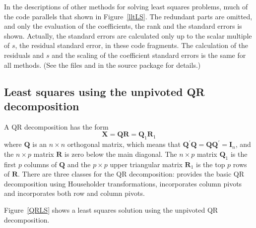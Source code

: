 \documentclass[shortnames,article]{jss}
\begin{document}
In the descriptions of other methods for solving least squares
problems, much of the code parallels that shown in
Figure~\ref{lltLS}.  The redundant parts are omitted, and only
the evaluation of the coefficients, the rank and the standard errors is shown.
Actually, the standard errors are calculated only up to the scalar
multiple of $s$, the residual standard error, in these code fragments.
The calculation of the residuals and $s$ and the scaling of the
coefficient standard errors is the same for all methods.  (See the
files  and  in the 
source package for details.)


\subsection{Least squares using the unpivoted QR decomposition}
\label{sec:QR}

A QR decomposition has the form
\begin{displaymath}
  \bm X=\bm Q\bm R=\bm Q_1\bm R_1
\end{displaymath}
where $\bm Q$ is an $n\times n$ orthogonal matrix, which means that
$\bm Q^\prime\bm Q=\bm Q\bm Q^\prime=\bm I_n$, and the $n\times p$
matrix $\bm R$ is zero below the main diagonal.  The $n\times p$
matrix $\bm Q_1$ is the first $p$ columns of $\bm Q$ and the $p\times
p$ upper triangular matrix $\bm R_1$ is the top $p$ rows of $\bm R$.
There are three  classes for the QR decomposition:
 provides the basic QR decomposition using
Householder transformations,  incorporates
column pivots and  incorporates both row
and column pivots.

Figure~\ref{QRLS} shows a least squares solution using the unpivoted
QR decomposition.
\end{document}
